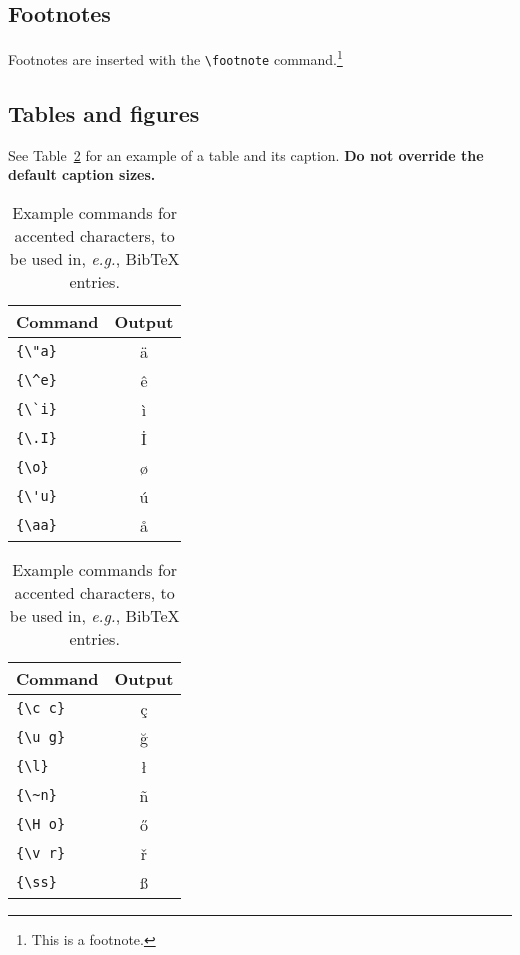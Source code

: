 \documentclass[11pt]{article}
\begin{document}
\subsection{Footnotes}

Footnotes are inserted with the \verb|\footnote| command.\footnote{This is a footnote.}

\subsection{Tables and figures}
See Table~\ref{tab:accents} for an example of a table and its caption.
\textbf{Do not override the default caption sizes.}

\begin{table}
  \centering
  \begin{tabular}{lc}
    \hline
    \textbf{Command} & \textbf{Output} \\
    \hline
    \verb|{\"a}|     & {\"a}           \\
    \verb|{\^e}|     & {\^e}           \\
    \verb|{\`i}|     & {\`i}           \\
    \verb|{\.I}|     & {\.I}           \\
    \verb|{\o}|      & {\o}            \\
    \verb|{\'u}|     & {\'u}           \\
    \verb|{\aa}|     & {\aa}           \\\hline
  \end{tabular}
  \begin{tabular}{lc}
    \hline
    \textbf{Command} & \textbf{Output} \\
    \hline
    \verb|{\c c}|    & {\c c}          \\
    \verb|{\u g}|    & {\u g}          \\
    \verb|{\l}|      & {\l}            \\
    \verb|{\~n}|     & {\~n}           \\
    \verb|{\H o}|    & {\H o}          \\
    \verb|{\v r}|    & {\v r}          \\
    \verb|{\ss}|     & {\ss}           \\
    \hline
  \end{tabular}
  \caption{Example commands for accented characters, to be used in, \emph{e.g.}, Bib\TeX{} entries.}
  \label{tab:accents}
\end{table}
\end{document}
